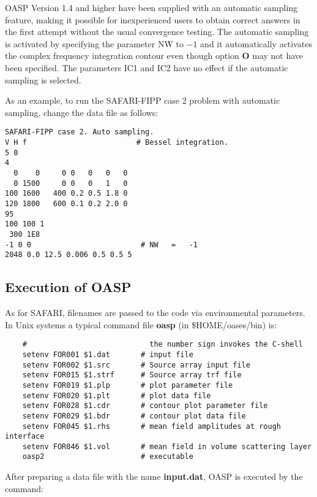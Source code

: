     OASP Version  1.4 and higher  have been supplied with  an  
automatic  sampling 
feature,  making  it possible for inexperienced users  to  obtain 
correct   answers  in  the  first  attempt  without   the   usual 
convergence  testing.  The  automatic sampling  is  activated  by 
specifying the parameter NW to $ -1$ and it automatically  activates 
the  complex frequency integration contour even though option  {\bf O} 
may  not have been specified. The parameters IC1 and IC2 have  no 
effect if the automatic sampling is selected.
 
As an example, to run the SAFARI-FIPP case 2 problem with automatic
sampling, change the data file as  follows:

\small
\begin{verbatim}
SAFARI-FIPP case 2. Auto sampling.
V H f                         # Bessel integration.
5 0
4
  0    0     0 0   0   0   0
  0 1500     0 0   0   1   0
100 1600   400 0.2 0.5 1.8 0
120 1800   600 0.1 0.2 2.0 0
95
100 100 1 
 300 1E8                      
-1 0 0                         # NW   =   -1
2048 0.0 12.5 0.006 0.5 0.5 5
\end{verbatim}
\normalsize 

\subsection{Execution of OASP}

    As  for  SAFARI,  filenames  are  passed  to  the  code   via 
environmental parameters. In Unix systems a typical command  file 
{\bf oasp} (in  \$HOME/oases/bin) is:

\small
\begin{verbatim}
    #                            the number sign invokes the C-shell 
    setenv FOR001 $1.dat       # input file 
    setenv FOR002 $1.src       # Source array input file
    setenv FOR015 $1.strf      # Source array trf file
    setenv FOR019 $1.plp       # plot parameter file
    setenv FOR020 $1.plt       # plot data file  
    setenv FOR028 $1.cdr       # contour plot parameter file 
    setenv FOR029 $1.bdr       # contour plot data file 
    setenv FOR045 $1.rhs       # mean field amplitudes at rough interface
    setenv FOR046 $1.vol       # mean field in volume scattering layer
    oasp2                      # executable
\end{verbatim}
\normalsize

    After preparing a data file with the name {\bf input.dat}, OASP  is 
executed by the command:

